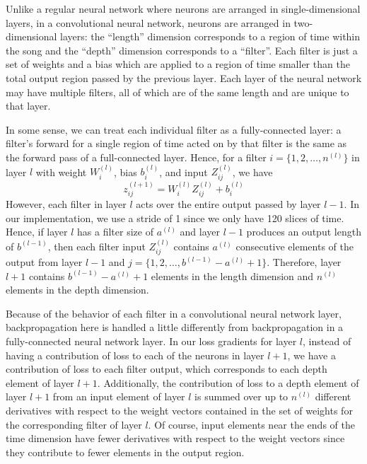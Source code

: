 \documentclass{article} %
\begin{document}
Unlike a regular neural network where neurons are arranged in single-dimensional layers, in a convolutional neural network, neurons are arranged in two-dimensional layers: the ``length'' dimension corresponds to a region of time within the song and the ``depth'' dimension corresponds to a ``filter''. Each filter is just a set of weights and a bias which are applied to a region of time smaller than the total output region passed by the previous layer. Each layer of the neural network may have multiple filters, all of which are of the same length and are unique to that layer.

In some sense, we can treat each individual filter as a fully-connected layer: a filter's forward for a single region of time acted on by that filter is the same as the forward pass of a full-connected layer. Hence, for a filter $i=\{1,2,\ldots,n^{(l)}\}$ in layer $l$ with weight $W^{(l)}_i$, bias $b^{(l)}_i$, and input $Z^{(l)}_{ij}$, we have
\begin{equation}
    z^{(l+1)}_{ij} = W^{(l)}_i Z^{(l)}_{ij} + b^{(l)}_i
\end{equation}
However, each filter in layer $l$ acts over the entire output passed by layer $l-1$. In our implementation, we use a stride of 1 since we only have 120 slices of time. Hence, if layer $l$ has a filter size of $a^{(l)}$ and layer $l-1$ produces an output length of $b^{(l-1)}$, then each filter input $Z^{(l)}_{ij}$ contains $a^{(l)}$ consecutive elements of the output from layer $l-1$ and $j=\{1,2,\ldots,b^{(l-1)}-a^{(l)}+1\}$. Therefore, layer $l+1$ contains $b^{(l-1)}-a^{(l)}+1$ elements in the length dimension and $n^{(l)}$ elements in the depth dimension.

Because of the behavior of each filter in a convolutional neural network layer, backpropagation here is handled a little differently from backpropagation in a fully-connected neural network layer. In our loss gradients for layer $l$, instead of having a contribution of loss to each of the neurons in layer $l+1$, we have a contribution of loss to each filter output, which corresponds to each depth element of layer $l+1$. Additionally, the contribution of loss to a depth element of layer $l+1$ from an input element of layer $l$ is summed over up to $n^{(l)}$ different derivatives with respect to the weight vectors contained in the set of weights for the corresponding filter of layer $l$. Of course, input elements near the ends of the time dimension have fewer derivatives with respect to the weight vectors since they contribute to fewer elements in the output region.
\end{document}
